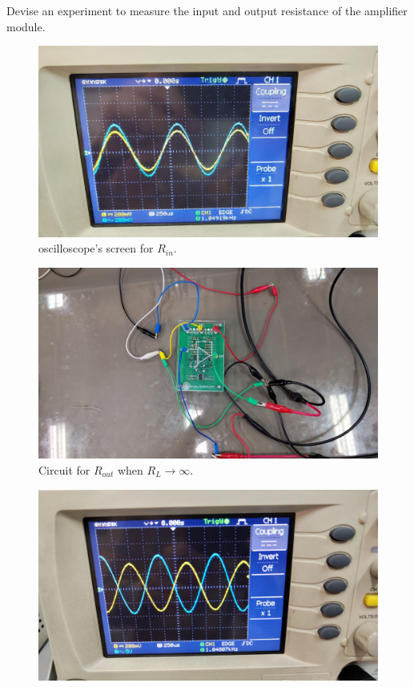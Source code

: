 \documentclass[11pt]{article}
\newcommand{\PicScale}{0.2}
\begin{document}
\begin{question}
\begin{subquestion}{Devise an experiment to measure the input and output resistance of the amplifier module.}
{            \begin{figure}[H]
                \centering
                \includegraphics[scale=\PicScale,angle=0]{Fig/39.jpeg}
                \caption{oscilloscope's screen for $R_{in}$.}
            \end{figure}
            \begin{figure}[H]
                \centering
                \includegraphics[scale=\PicScale,angle=0]{Fig/40.jpeg}
                \caption{Circuit for $R_{out}$ when $R_L \to \infty$.}
            \end{figure}
            \begin{figure}[H]
                \centering
                \includegraphics[scale=\PicScale,angle=0]{Fig/41.jpeg}

\end{figure}}
\end{subquestion}
\end{question}
\end{document}
